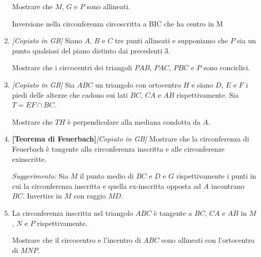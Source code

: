 \begin{enumerate}
	Mostrare che $M$, $G$ e $P$ sono allineati.
	\begin{sol}
	Inversione nella circonferenza circoscritta a BIC che ha centro in M
    \end{sol}

	\item \emph{[Copiato in GB]} Siano $A$, $B$ e $C$ tre punti allineati e supponiamo che $P$ sia un punto qualsiasi del piano distinto dai precedenti 3. 
	
	Mostrare che i circocentri dei triangoli $PAB$, $PAC$, $PBC$ e $P$ sono conciclici.
	\item \emph{[Copiato in GB]} Sia $ABC$ un triangolo con ortocentro $H$ e siano $D$, $E$ e $F$ i piedi delle altezze che cadono sui lati $BC$, $CA$ e $AB$ rispettivamente. Sia $T=EF\cap BC$.
	
	Mostrare che $TH$ è perpendicolare alla mediana condotta da $A$.
    \item \textbf{[Teorema di Feuerbach]}\emph{[Copiato in GB]} Mostrare che la circonferenza di Feuerbach è tangente alla circonferenza inscritta e alle circonferenze exinscritte.
    
    \emph{Suggerimento:} Sia $M$ il punto medio di $BC$ e $D$ e $G$ rispettivamente i punti in cui la circonferenza inscritta e quella ex-inscritta opposta ad $A$ incontrano $BC$. Invertire in $M$ con raggio $MD$.
    
    \item La circonferenza inscritta nel triangolo $ABC$ è tangente a $BC$, $CA$ e $AB$ in $M$, $N$ e $P$ rispettivamente. 
    
    Mostrare che il circocentro e l'incentro di $ABC$ sono allineati con l'ortocentro di $MNP$.
\end{enumerate}

